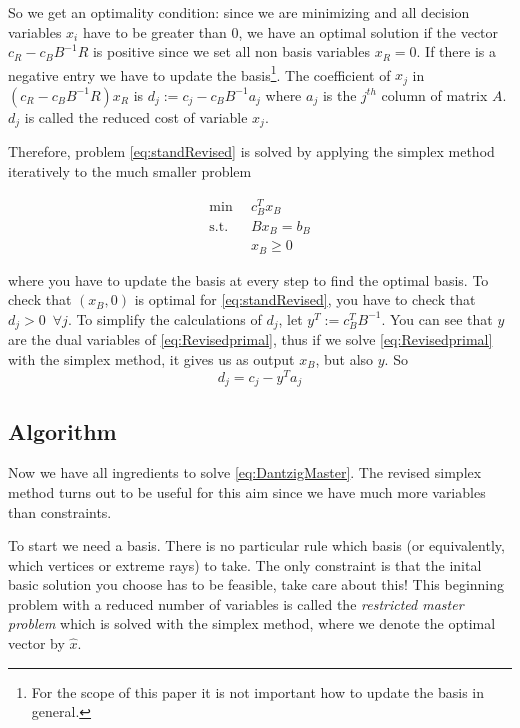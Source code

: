 \documentclass[a4paper,12pt]{article}
\begin{document}
So we get an optimality condition: since we are minimizing  and all decision variables $x_i$ have to be greater than $0$, we have an optimal solution if the vector $c_R-c_BB^{-1}R$ is positive since we set all non basis variables $x_R = 0$. If there is a negative entry we have to update the basis\footnote{For the scope of this paper it is not important how to update the basis in general.}. The coefficient of $x_j$ in $(c_R-c_BB^{-1}R)x_R$ is $d_j := c_j - c_BB^{-1}a_j$ where $a_j$ is the $j^{th}$ column of matrix $A$. $d_j$ is called the reduced cost of variable $x_j$. 

Therefore, problem \eqref{eq:standRevised} is solved by applying the simplex method iteratively to the much smaller problem 

\begin{equation}
\begin{aligned}  
\min \enspace& c_B^Tx_B \\
\text{s.t.} \enspace& Bx_B = b_B \\
&x_B \geq 0 
\label{eq:Revisedprimal}
\end{aligned}
\end{equation}

where you have to update the basis at every step to find the optimal basis. To check that $(x_B,0)$ is optimal for \eqref{eq:standRevised}, you have to check that $d_j>0 \enspace \forall j$. To simplify the calculations of $d_j$, let $y^T := c_B^TB^{-1}$. You can see that $y$ are the dual variables of \eqref{eq:Revisedprimal}, thus if we solve \eqref{eq:Revisedprimal} with the simplex method, it gives us as output $x_B$, but also $y$. So 
\begin{equation}
\label{eq:reduced cost}
d_j = c_j - y^Ta_j
\end{equation}



\subsection{Algorithm}

Now we have all ingredients to solve \eqref{eq:DantzigMaster}. The revised simplex method turns out to be useful for this aim since we have much more variables than constraints. 

To start we need a basis. There is no particular rule which basis (or equivalently, which vertices or extreme rays) to take. The only constraint is that the inital basic solution you choose has to be feasible, take care about this! This beginning problem with a reduced number of variables is called the \textit{restricted master problem} which is solved with the simplex method, where we denote the optimal vector by $\widehat{x}$.
\end{document}
